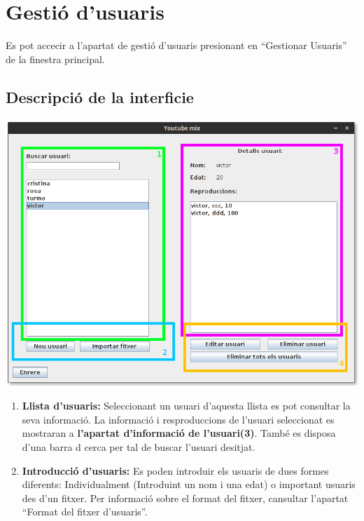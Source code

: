 \documentclass[a4paper,10pt,oneside]{sphinxmanual}
\begin{document}
\chapter{Gestió d'usuaris}
\label{gest_usuaris::doc}\label{gest_usuaris:gestio-d-usuaris}
Es pot accecir a l'apartat de gestió d'usuaris presionant en ``Gestionar Usuaris'' de la finestra principal.


\section{Descripció de la interficie}
\label{gest_usuaris:descripcio-de-la-interficie}
\includegraphics{gest_usr.png}
\begin{enumerate}
\item {} 
\textbf{Llista d'usuaris:} Seleccionant un usuari d'aquesta llista es pot consultar la seva informació. La informació i resproduccions de l'usuari seleccionat es mostraran a \textbf{l'apartat d'informació de l'usuari(3)}. També es disposa d'una barra d cerca per tal de buscar l'usuari desitjat.

\item {} 
\textbf{Introducció d'usuaris:} Es poden introduir els usuaris de dues formes diferents: Individualment (Introduint un nom i una edat) o important usuaris des d'un fitxer. Per informació sobre el format del fitxer, cansultar l'apartat ``Format del fitxer d'usuaris''.

\end{enumerate}
\end{document}
